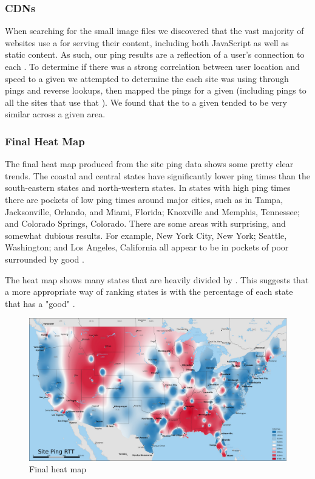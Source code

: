 \subsubsection{CDNs}
When searching for the small image files we discovered that the vast majority of websites use a \cdn for serving their content, including both JavaScript as well as static content. As such, our ping results are a reflection of a user's connection to each \cdn. To determine if there was a strong correlation between user location and speed to a given \cdn we attempted to determine the \cdn each site was using through \icmp pings and reverse \dns lookups, then mapped the pings for a given \cdn (including pings to all the sites that use that \cdn). We found that the \rtt to a given \cdn tended to be very similar across a given area. 

\subsubsection{Final Heat Map}
The final heat map produced from the site ping data shows some pretty clear trends. The coastal and central states have significantly lower ping times than the south-eastern states and north-western states. In states with high ping times there are pockets of low ping times around major cities, such as in  Tampa, Jacksonville, Orlando, and Miami, Florida; Knoxville and Memphis, Tennessee; and Colorado Springs, Colorado. There are some areas with surprising, and somewhat dubious results. For example, New York City, New York; Seattle, Washington; and Los Angeles, California all appear to be in pockets of poor \rtt surrounded by good \rtt.

The heat map shows many states that are heavily divided by \rtt. This suggests that a more appropriate way of ranking states is with the percentage of each state that has a "good" \rtt.

\begin{figure}[h]
    \centering
    \includegraphics{images/siteping/site_ping_rtt_idw.jpg}
    \caption{Final heat map} %
    \label{fig:siteping_heatmap}
\end{figure}
